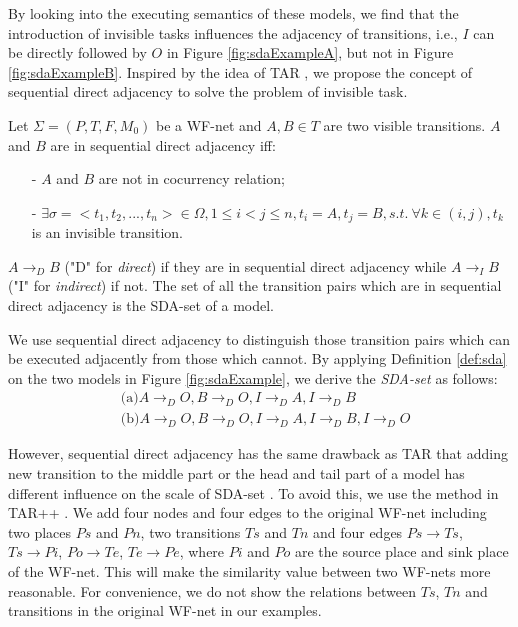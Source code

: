 \documentclass{llncs}
\begin{document}
By looking into the executing semantics of these models, we find that the introduction of invisible tasks influences the adjacency of transitions, i.e., $I$ can be directly followed by $O$ in Figure \ref{fig:sdaExampleA}, but not in Figure \ref{fig:sdaExampleB}. Inspired by the idea of TAR \cite{zha2010workflow}, we propose the concept of sequential direct adjacency to solve the problem of invisible task.

\begin{definition}\label{def:sda}
Let $\Sigma=(P,T,F,M_{0})$ be a WF-net and $A,B\in T$ are two visible transitions. $A$ and $B$ are in sequential direct adjacency iff:
	\begin{itemize}
		\item[-] $A$ and $B$ are not in cocurrency relation;
		\item[-] $\exists\sigma=<t_{1},t_{2},...,t_{n}>\in\Omega,1\leq i<j\leq n,t_{i}=A,t_{j}=B,s.t.~\forall k\in(i,j),t_{k}$ is an invisible transition.
	\end{itemize}
$A\rightarrow_{D}B$ ("D" for \textit{direct}) if they are in sequential direct adjacency while $A\rightarrow_{I}B$ ("I" for \textit{indirect}) if not. The set of all the transition pairs which are in sequential direct adjacency is the SDA-set of a model.
\end{definition}

We use sequential direct adjacency to distinguish those transition pairs which can be executed adjacently from those which cannot. By applying Definition \ref{def:sda} on the two models in Figure \ref{fig:sdaExample}, we derive the \textit{SDA-set} as follows:
\begin{displaymath}
	\begin{aligned}
		&\text{(a)} A\rightarrow_{D}O, B\rightarrow_{D}O, I\rightarrow_{D}A, I\rightarrow_{D}B\\
		&\text{(b)} A\rightarrow_{D}O, B\rightarrow_{D}O, I\rightarrow_{D}A, I\rightarrow_{D}B, I\rightarrow_{D}O
	\end{aligned}
\end{displaymath}

However, sequential direct adjacency has the same drawback as TAR that adding new transition to the middle part or the head and tail part of a model has different influence on the scale of SDA-set \cite{wang2015tar++}. To avoid this, we use the method in TAR++ \cite{wang2015tar++}. We add four nodes and four edges to the original WF-net including two places $Ps$ and $Pn$, two transitions $Ts$ and $Tn$ and four edges $Ps\rightarrow Ts$, $Ts\rightarrow Pi$, $Po\rightarrow Te$, $Te\rightarrow Pe$, where $Pi$ and $Po$ are the source place and sink place of the WF-net. This will make the similarity value between two WF-nets more reasonable. For convenience, we do not show the relations between $Ts$, $Tn$ and transitions in the original WF-net in our examples.
\end{document}
